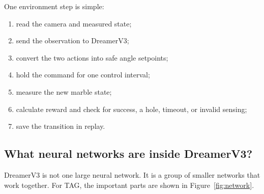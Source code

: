 \documentclass[9pt]{extarticle}
\begin{document}
One environment step is simple:
\begin{enumerate}
\item read the camera and measured state;
\item send the observation to DreamerV3;
\item convert the two actions into safe angle setpoints;
\item hold the command for one control interval;
\item measure the new marble state;
\item calculate reward and check for success, a hole, timeout, or invalid sensing;
\item save the transition in replay.
\end{enumerate}

\subsection{What neural networks are inside DreamerV3?}
DreamerV3 is not one large neural network. It is a group of smaller networks that work together. For TAG, the important parts are shown in Figure~\ref{fig:network}.
\end{document}
